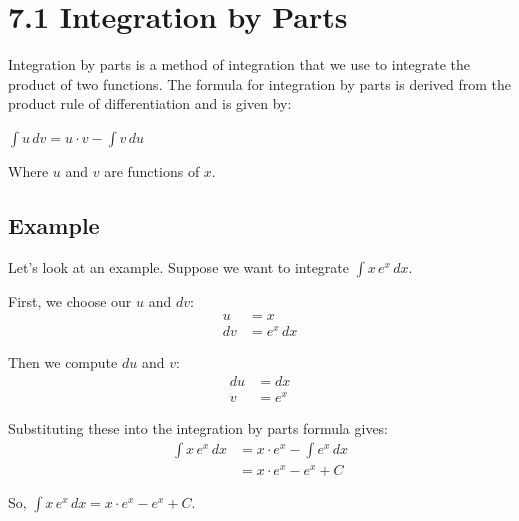 \section{7.1 Integration by Parts}

Integration by parts is a method of integration that we use to integrate the product of two functions. The formula for integration by parts is derived from the product rule of differentiation and is given by:

\begin{tcolorbox}[colback=red!5!white,colframe=red!75!black]
  \begin{center}
    $\int u \, dv = u \cdot v - \int v \, du$
  \end{center}
\end{tcolorbox}

Where $u$ and $v$ are functions of $x$.

\subsection{Example}
Let's look at an example. Suppose we want to integrate $\int x \, e^x \, dx$.

First, we choose our $u$ and $dv$:
\begin{align*}
    u &= x \\
    dv &= e^x \, dx
\end{align*}

Then we compute $du$ and $v$:
\begin{align*}
    du &= dx \\
    v &= e^x
\end{align*}

Substituting these into the integration by parts formula gives:
\begin{align*}
    \int x \, e^x \, dx &= x \cdot e^x - \int e^x \, dx \\
    &= x \cdot e^x - e^x + C
\end{align*}

So, $\int x \, e^x \, dx = x \cdot e^x - e^x + C$.